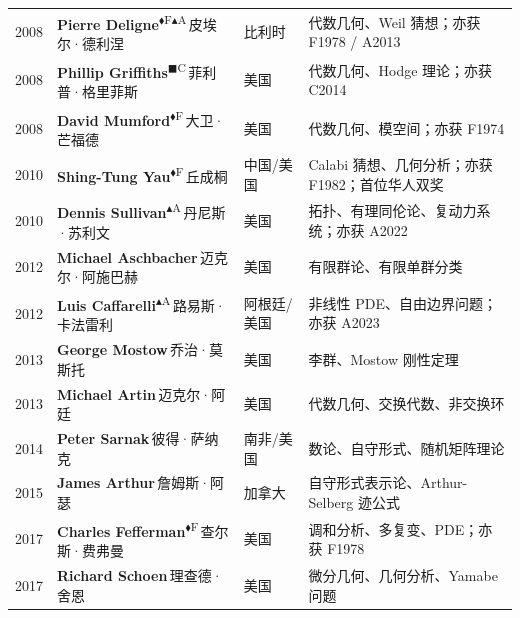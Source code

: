 \documentclass[a4paper,10pt]{article}
\newcommand{\Fbadge}{\textsuperscript{\normalfont\scriptsize\sffamily\color{fieldsclr}$\blacklozenge$F}}
\newcommand{\Abadge}{\textsuperscript{\normalfont\scriptsize\sffamily\color{abelclr}$\blacktriangle$A}}
\newcommand{\Cbadge}{\textsuperscript{\normalfont\scriptsize\sffamily\color{chernclr}$\blacksquare$C}}
\begin{document}
\begin{longtable}{
  >{\raggedright}m{1.8cm}
  >{\raggedright}m{7.0cm}
  >{\raggedright}m{4.2cm}
  >{\raggedright\arraybackslash}m{9.5cm}
}
{\color{yearcolor}2008} & {\bfseries Pierre Deligne}\Fbadge\Abadge\,{\small\color{mutedgray}皮埃尔·德利涅} & 比利时 & {\small\color{fieldcolor}代数几何、Weil 猜想；亦获 F1978 / A2013} \\[2pt]
{\color{yearcolor}2008} & {\bfseries Phillip Griffiths}\Cbadge\,{\small\color{mutedgray}菲利普·格里菲斯} & 美国 & {\small\color{fieldcolor}代数几何、Hodge 理论；亦获 C2014} \\[2pt]
{\color{yearcolor}2008} & {\bfseries David Mumford}\Fbadge\,{\small\color{mutedgray}大卫·芒福德} & 美国 & {\small\color{fieldcolor}代数几何、模空间；亦获 F1974} \\[2pt]
{\color{yearcolor}2010} & {\bfseries Shing-Tung Yau}\Fbadge\,{\small\color{mutedgray}丘成桐} & 中国/美国 & {\small\color{fieldcolor}Calabi 猜想、几何分析；亦获 F1982；首位华人双奖} \\[2pt]
{\color{yearcolor}2010} & {\bfseries Dennis Sullivan}\Abadge\,{\small\color{mutedgray}丹尼斯·苏利文} & 美国 & {\small\color{fieldcolor}拓扑、有理同伦论、复动力系统；亦获 A2022} \\[2pt]
{\color{yearcolor}2012} & {\bfseries Michael Aschbacher}\,{\small\color{mutedgray}迈克尔·阿施巴赫} & 美国 & {\small\color{fieldcolor}有限群论、有限单群分类} \\[2pt]
{\color{yearcolor}2012} & {\bfseries Luis Caffarelli}\Abadge\,{\small\color{mutedgray}路易斯·卡法雷利} & 阿根廷/美国 & {\small\color{fieldcolor}非线性 PDE、自由边界问题；亦获 A2023} \\[2pt]
{\color{yearcolor}2013} & {\bfseries George Mostow}\,{\small\color{mutedgray}乔治·莫斯托} & 美国 & {\small\color{fieldcolor}李群、Mostow 刚性定理} \\[2pt]
{\color{yearcolor}2013} & {\bfseries Michael Artin}\,{\small\color{mutedgray}迈克尔·阿廷} & 美国 & {\small\color{fieldcolor}代数几何、交换代数、非交换环} \\[2pt]
{\color{yearcolor}2014} & {\bfseries Peter Sarnak}\,{\small\color{mutedgray}彼得·萨纳克} & 南非/美国 & {\small\color{fieldcolor}数论、自守形式、随机矩阵理论} \\[2pt]
{\color{yearcolor}2015} & {\bfseries James Arthur}\,{\small\color{mutedgray}詹姆斯·阿瑟} & 加拿大 & {\small\color{fieldcolor}自守形式表示论、Arthur-Selberg 迹公式} \\[2pt]
{\color{yearcolor}2017} & {\bfseries Charles Fefferman}\Fbadge\,{\small\color{mutedgray}查尔斯·费弗曼} & 美国 & {\small\color{fieldcolor}调和分析、多复变、PDE；亦获 F1978} \\[2pt]
{\color{yearcolor}2017} & {\bfseries Richard Schoen}\,{\small\color{mutedgray}理查德·舍恩} & 美国 & {\small\color{fieldcolor}微分几何、几何分析、Yamabe 问题} \\[2pt]

\end{longtable}
\end{document}
